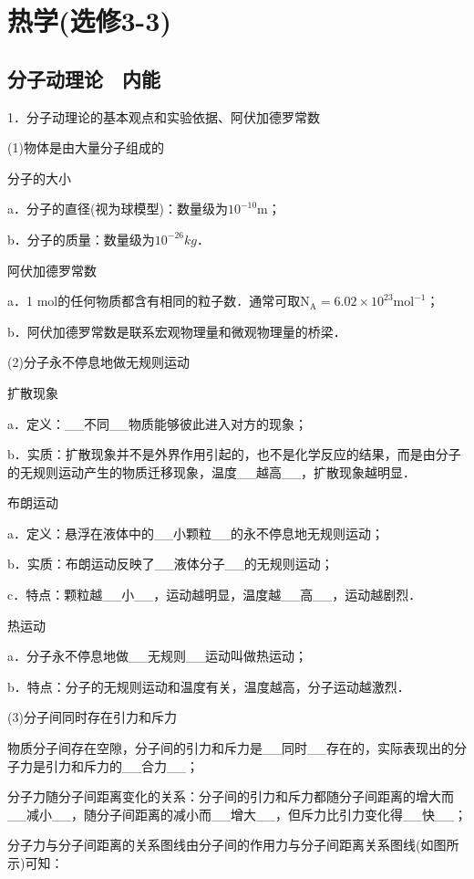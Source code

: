 \chapter{热学(选修3-3)}
\section{分子动理论　内能}

1．分子动理论的基本观点和实验依据、阿伏加德罗常数

(1)物体是由大量分子组成的

分子的大小

a．分子的直径(视为球模型)：数量级为$10^{-10}$m；

b．分子的质量：数量级为$10^{-26} kg$．

阿伏加德罗常数

a．1
mol的任何物质都含有相同的粒子数．通常可取$\mathrm{N}_{\mathrm{A}}=6.02 \times 10^{23} \mathrm{mol}^{-1}$；

b．阿伏加德罗常数是联系宏观物理量和微观物理量的桥梁．

(2)分子永不停息地做无规则运动

扩散现象

a．定义：\_\_不同\_\_物质能够彼此进入对方的现象；

b．实质：扩散现象并不是外界作用引起的，也不是化学反应的结果，而是由分子的无规则运动产生的物质迁移现象，温度\_\_越高\_\_，扩散现象越明显．

布朗运动

a．定义：悬浮在液体中的\_\_小颗粒\_\_的永不停息地无规则运动；

b．实质：布朗运动反映了\_\_液体分子\_\_的无规则运动；

c．特点：颗粒越\_\_小\_\_，运动越明显，温度越\_\_高\_\_，运动越剧烈．

热运动

a．分子永不停息地做\_\_无规则\_\_运动叫做热运动；

b．特点：分子的无规则运动和温度有关，温度越高，分子运动越激烈．

(3)分子间同时存在引力和斥力

物质分子间存在空隙，分子间的引力和斥力是\_\_同时\_\_存在的，实际表现出的分子力是引力和斥力的\_\_合力\_\_；

分子力随分子间距离变化的关系：分子间的引力和斥力都随分子间距离的增大而\_\_减小\_\_，随分子间距离的减小而\_\_增大\_\_，但斥力比引力变化得\_\_快\_\_；

分子力与分子间距离的关系图线由分子间的作用力与分子间距离关系图线(如图所示)可知：


